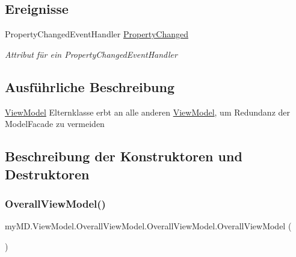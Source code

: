\subsection*{Ereignisse}
\begin{DoxyCompactItemize}
\item 
Property\+Changed\+Event\+Handler \mbox{\hyperlink{classmy_m_d_1_1_view_model_1_1_overall_view_model_1_1_overall_view_model_a1918d3d8d384486e278426327b16256f}{Property\+Changed}}
\begin{DoxyCompactList}\small\item\em Attribut für ein Property\+Changed\+Event\+Handler \end{DoxyCompactList}\end{DoxyCompactItemize}


\subsection{Ausführliche Beschreibung}
\mbox{\hyperlink{namespacemy_m_d_1_1_view_model}{View\+Model}} Elternklasse erbt an alle anderen \mbox{\hyperlink{namespacemy_m_d_1_1_view_model}{View\+Model}}, um Redundanz der Model\+Facade zu vermeiden 



\subsection{Beschreibung der Konstruktoren und Destruktoren}
\mbox{\label{classmy_m_d_1_1_view_model_1_1_overall_view_model_1_1_overall_view_model_a1cc6b22c187773cdc72ee92f21ea5aba}} 
\subsubsection{\texorpdfstring{Overall\+View\+Model()}{OverallViewModel()}}
{\footnotesize\ttfamily my\+M\+D.\+View\+Model.\+Overall\+View\+Model.\+Overall\+View\+Model.\+Overall\+View\+Model (\begin{DoxyParamCaption}{ }\end{DoxyParamCaption})}



